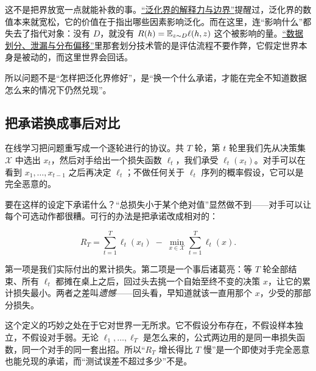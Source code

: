 这不是把界放宽一点就能补救的事。\hyperref[sec:13-Machine-Learning/10-Learning-Theory/04]{``泛化界的解释力与边界''}提醒过，泛化界的数值本来就宽松，它的价值在于指出哪些因素影响泛化。而在这里，连``影响什么''都失去了指代对象：没有 \(D\)，就没有 \(R(h)=\mathbb{E}_{z\sim D}\ell(h,z)\) 这个被影响的量。\hyperref[sec:13-Machine-Learning/01-Learning-Problems-and-Evaluation/04]{``数据划分、泄漏与分布偏移''}里那套划分技术管的是评估流程不要作弊，它假定世界本身是被动的，而这里世界会回话。

所以问题不是``怎样把泛化界修好''，是``换一个什么承诺，才能在完全不知道数据怎么来的情况下仍然兑现''。

\subsection{把承诺换成事后对比}

在线学习把问题重写成一个逐轮进行的协议。共 \(T\) 轮，第 \(t\) 轮里我们先从决策集 \(\mathcal X\) 中选出 \(x_t\)，然后对手给出一个损失函数 \(\ell_t\)，我们承受 \(\ell_t(x_t)\)。对手可以在看到 \(x_1,\dots,x_{t-1}\) 之后再决定 \(\ell_t\)；不做任何关于 \(\ell_t\) 序列的概率假设，它可以是完全恶意的。

要在这样的设定下承诺什么？``总损失小于某个绝对值''显然做不到——对手可以让每个可选动作都很糟。可行的办法是把承诺改成相对的：

\[
R_T=\sum_{t=1}^{T}\ell_t(x_t)\;-\;\min_{x\in\mathcal X}\sum_{t=1}^{T}\ell_t(x).
\]

第一项是我们实际付出的累计损失。第二项是一个事后诸葛亮：等 \(T\) 轮全部结束、所有 \(\ell_t\) 都摊在桌上之后，回过头去挑一个自始至终不变的决策 \(x\)，让它的累计损失最小。两者之差叫\emph{遗憾}——回头看，早知道就该一直用那个 \(x\)，少受的那部分损失。

这个定义的巧妙之处在于它对世界一无所求。它不假设分布存在，不假设样本独立，不假设对手弱。无论 \(\ell_1,\dots,\ell_T\) 是怎么来的，公式两边用的是同一串损失函数，同一个对手的同一套出招。所以``\(R_T\) 增长得比 \(T\) 慢''是一个即使对手完全恶意也能兑现的承诺，而``测试误差不超过多少''不是。

